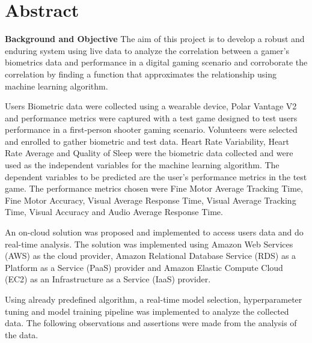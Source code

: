 \chapter{Abstract}
\textbf{Background and Objective} The aim of this project is to develop a robust and enduring system using live data to analyze the correlation between a gamer's 
biometrics data and performance in a digital gaming scenario and corroborate the correlation by finding a function that approximates the relationship 
using machine learning algorithm.

Users Biometric data were collected using a wearable device, Polar Vantage V2 and performance metrics were captured 
with a test game designed to test users performance in a first-person shooter gaming scenario. Volunteers were selected and enrolled to gather biometric 
and test data. Heart Rate Variability, Heart Rate Average and Quality of Sleep were the biometric data collected and were used as the independent 
variables for the machine learning algorithm. The dependent variables to be predicted are the user's performance metrics in the test game. 
The performance metrics chosen were Fine Motor Average Tracking Time, Fine Motor Accuracy, Visual Average Response Time, Visual Average Tracking Time,
Visual Accuracy and Audio Average Response Time.

An on-cloud solution was proposed and implemented to access users data and do real-time analysis. The solution was implemented using Amazon Web Services (AWS)
as the cloud provider, Amazon Relational Database Service (RDS) as a Platform as a Service (PaaS) provider and Amazon Elastic Compute Cloud (EC2) as an
Infrastructure as a Service (IaaS) provider.

Using already predefined algorithm, a real-time model selection, hyperparameter tuning and model training pipeline was implemented to analyze the collected 
data. The following observations and assertions were made from the analysis of the data. 

